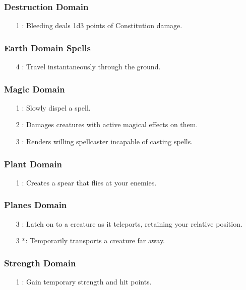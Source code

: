 \subsubsection{Destruction Domain}
\begin{itemize}
 \item[1] : Bleeding deals 1d3 points of Constitution damage.
\end{itemize}
\subsubsection{Earth Domain Spells}
\begin{itemize}
 \item[4] : Travel instantaneously through the ground.
\end{itemize}
\subsubsection{Magic Domain}
\begin{itemize}
 \item[1] : Slowly dispel a spell.
 \item[2] : Damages creatures with active magical effects on them.
 \item[3] : Renders willing spellcaster incapable of casting spells.
\end{itemize}
\subsubsection{Plant Domain}
\begin{itemize}
 \item[1] : Creates a spear that flies at your enemies.
\end{itemize}
\subsubsection{Planes Domain}
\begin{itemize}
 \item[3] : Latch on to a creature as it teleports, retaining your relative position.
 \item[3] *: Temporarily transports a creature far away.
\end{itemize}
\subsubsection{Strength Domain}
\begin{itemize}
 \item[1] : Gain temporary strength and hit points.
\end{itemize}
